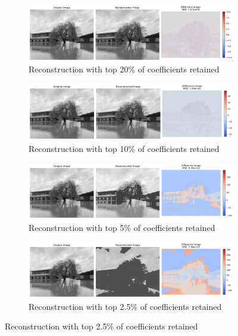 \documentclass[11pt]{article}
\begin{document}
\begin{figure}[H]
    \centering
    \begin{subfigure}{.9\textwidth}
        \centering
        \includegraphics[width=\linewidth]{figs/q2c_river_side_threshold_0_2.jpeg}
        \caption{Reconstruction with top 20\% of coefficients retained}
        \label{fig:reconstructed_20}
    \end{subfigure}
    
    \begin{subfigure}{.9\textwidth}
        \centering
        \includegraphics[width=\linewidth]{figs/q2c_river_side_threshold_0_1.jpeg}
        \caption{Reconstruction with top 10\% of coefficients retained}
        \label{fig:reconstructed_10}
    \end{subfigure}
    
    \begin{subfigure}{.9\textwidth}
        \centering
        \includegraphics[width=\linewidth]{figs/q2c_river_side_threshold_0_05.jpeg}
        \caption{Reconstruction with top 5\% of coefficients retained}
        \label{fig:reconstructed_5}
    \end{subfigure}
    
    \begin{subfigure}{.9\textwidth}
        \centering
        \includegraphics[width=\linewidth]{figs/q2c_river_side_threshold_0_025.jpeg}
        \caption{Reconstruction with top 2.5\% of coefficients retained}
        \label{fig:reconstructed_2_5}
    \end{subfigure}
    

\end{figure}
\end{document}
